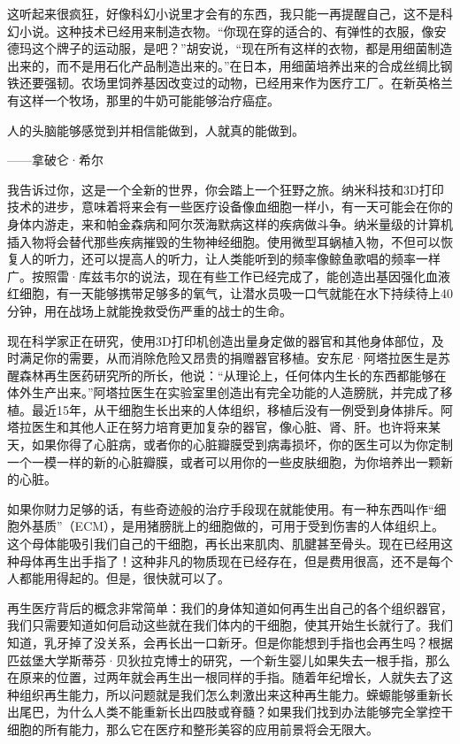 这听起来很疯狂，好像科幻小说里才会有的东西，我只能一再提醒自己，这不是科幻小说。这种技术已经用来制造衣物。“你现在穿的适合的、有弹性的衣服，像安德玛这个牌子的运动服，是吧？”胡安说，“现在所有这样的衣物，都是用细菌制造出来的，而不是用石化产品制造出来的。”在日本，用细菌培养出来的合成丝绸比钢铁还要强韧。农场里饲养基因改变过的动物，已经用来作为医疗工厂。在新英格兰有这样一个牧场，那里的牛奶可能能够治疗癌症。

\begin{BookQuote}
人的头脑能够感觉到并相信能做到，人就真的能做到。

\hfill ——拿破仑·希尔
\end{BookQuote}

我告诉过你，这是一个全新的世界，你会踏上一个狂野之旅。纳米科技和3D打印技术的进步，意味着将来会有一些医疗设备像血细胞一样小，有一天可能会在你的身体内游走，来和帕金森病和阿尔茨海默病这样的疾病做斗争。纳米量级的计算机插入物将会替代那些疾病摧毁的生物神经细胞。使用微型耳蜗植入物，不但可以恢复人的听力，还可以提高人的听力，让人类能听到的频率像鲸鱼歌唱的频率一样广。按照雷·库兹韦尔的说法，现在有些工作已经完成了，能创造出基因强化血液红细胞，有一天能够携带足够多的氧气，让潜水员吸一口气就能在水下持续待上40分钟，用在战场上就能挽救受伤严重的战士的生命。

现在科学家正在研究，使用3D打印机创造出量身定做的器官和其他身体部位，及时满足你的需要，从而消除危险又昂贵的捐赠器官移植。安东尼·阿塔拉医生是苏醒森林再生医药研究所的所长，他说：“从理论上，任何体内生长的东西都能够在体外生产出来。”阿塔拉医生在实验室里创造出有完全功能的人造膀胱，并完成了移植。最近15年，从干细胞生长出来的人体组织，移植后没有一例受到身体排斥。阿塔拉医生和其他人正在努力培育更加复杂的器官，像心脏、肾、肝。也许将来某天，如果你得了心脏病，或者你的心脏瓣膜受到病毒损坏，你的医生可以为你定制一个一模一样的新的心脏瓣膜，或者可以用你的一些皮肤细胞，为你培养出一颗新的心脏。

如果你财力足够的话，有些奇迹般的治疗手段现在就能使用。有一种东西叫作“细胞外基质”（ECM），是用猪膀胱上的细胞做的，可用于受到伤害的人体组织上。这个母体能吸引我们自己的干细胞，再长出来肌肉、肌腱甚至骨头。现在已经用这种母体再生出手指了！这种非凡的物质现在已经存在，但是费用很高，还不是每个人都能用得起的。但是，很快就可以了。

再生医疗背后的概念非常简单：我们的身体知道如何再生出自己的各个组织器官，我们只需要知道如何启动这些就在我们体内的干细胞，使其开始生长就行了。我们知道，乳牙掉了没关系，会再长出一口新牙。但是你能想到手指也会再生吗？根据匹兹堡大学斯蒂芬·贝狄拉克博士的研究，一个新生婴儿如果失去一根手指，那么在原来的位置，过两年就会再生出一根同样的手指。随着年纪增长，人就失去了这种组织再生能力，所以问题就是我们怎么刺激出来这种再生能力。蝾螈能够重新长出尾巴，为什么人类不能重新长出四肢或脊髓？如果我们找到办法能够完全掌控干细胞的所有能力，那么它在医疗和整形美容的应用前景将会无限大。

